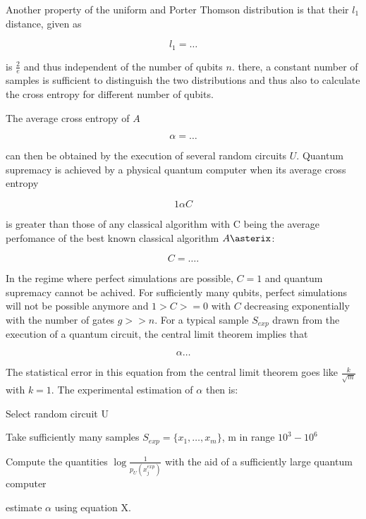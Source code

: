 Another property of the uniform and Porter Thomson distribution is that their
$l_1$ distance, given as

\begin{equation}
 l_1 = \dots
\end{equation}

is $\frac{2}{e}$ and thus independent of the number of qubits $n$. there, a
constant number of samples is sufficient to distinguish the two distributions
and thus also to calculate the cross entropy for different number of qubits.

The average cross entropy of $A$

\begin{equation}
  \alpha = \dots
\end{equation}

can then be obtained by the execution of several random circuits $U$. Quantum
supremacy is achieved by a physical quantum computer when its average cross
entropy

\begin{equation}
  1 \alpha C
\end{equation}

is greater than those of any classical algorithm with C being the average
perfomance of the best known classical algorithm $A\asterix$:

\begin{equation}
  C = \dots .
\end{equation}

In the regime where perfect simulations are possible, $C=1$ and quantum
supremacy cannot be achived. For sufficiently many qubits, perfect simulations
will not be possible anymore and $1 > C >= 0$ with $C$ decreasing exponentially
with the number of gates $g>>n$. For a typical sample $S_{exp}$ drawn from the
execution of a quantum circuit, the central limit theorem implies that

\begin{equation}
  \alpha \dots
\end{equation}

The statistical error in this equation from the central limit theorem goes like
$\frac{k}{\sqrt{m}}$ with $k=1$. The experimental estimation of $\alpha$ then
is:

\begin{enumeration}
\item Select random circuit U
  \item Take sufficiently many samples $S_{exp} = \{x_1, \dots, x_m\}$, m in
    range $10^3-10^6$
    \item Compute the quantities $\log{\frac{1}{p_U(x_j^{exp})}}$ with the aid
      of a sufficiently large quantum computer
      \item estimate $\alpha$ using equation X.
\end{enumeration}

